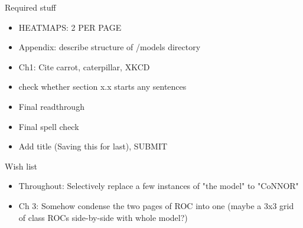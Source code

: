 
Required stuff

\begin{itemize}
\item HEATMAPS: 2 PER PAGE
\item Appendix: describe structure of /models directory
\item Ch1: Cite carrot, caterpillar, XKCD
\item check whether section x.x starts any sentences
\item Final readthrough
\item Final spell check
\item Add title (Saving this for last), SUBMIT
\end{itemize}


Wish list

\begin{itemize}
\item Throughout: Selectively replace a few instances of "the model" to "CoNNOR"
\item Ch 3: Somehow condense the two pages of ROC into one (maybe a 3x3 grid of class ROCs side-by-side with whole model?)
\end{itemize}


